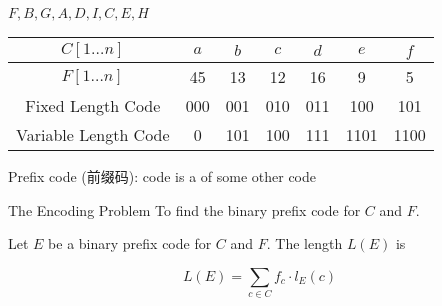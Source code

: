 \begin{frame}{}

  \begin{description}
    \centering
    \item[Breadth-First Search (BFS):] $F, B, G, A, D, I, C, E, H$
  \end{description}
\end{frame}

\begin{frame}{}

  \begin{center}
  \end{center}
\end{frame}

\begin{frame}{}
  \begin{center}
    \begin{table}
      \centering
      \renewcommand*{\arraystretch}{1.3}
      \begin{tabular}{|c|c|c|c|c|c|c|}
	\hline
        $C[1 \dots n]$ & $a$ & $b$ & $c$ & $d$ & $e$ & $f$ \\ \hline
	$F[1 \dots n]$ & 45 & 13 & 12 & 16 & 9 & 5 \\ \hline
	Fixed Length Code & 000 & 001 & 010 & 011 & 100 & 101 \\ \hline
	Variable Length Code & 0 & 101 & 100 & 111 & 1101 & 1100 \\ \hline
      \end{tabular}
    \end{table}

    \vspace{0.80cm}
    Prefix code (前缀码):  code is a  of some other code
  \end{center}
\end{frame}

\begin{frame}{}
  \begin{exampleblock}{The Encoding Problem}
    To find the  binary prefix code for $C$ and $F$.
  \end{exampleblock}

  \vspace{0.50cm}
  \begin{center}
    Let $E$ be a binary prefix code for $C$ and $F$.
    The length $L(E)$ is
  \end{center}
  \[
    L(E) = \sum_{c \in C} f_{c} \cdot l_{E}(c)
  \]
\end{frame}

